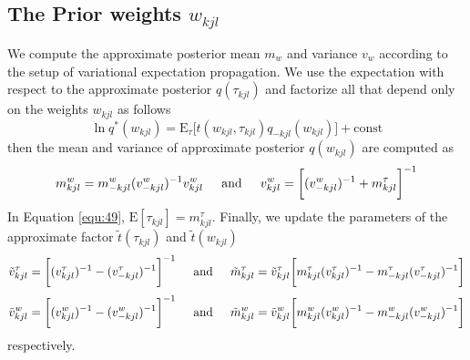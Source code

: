 \documentclass[]{article}
\begin{document}
\subsection{The Prior weights $w_{kjl}$}
We compute the approximate posterior mean $m_w$ and variance $v_w$ according to the setup of variational expectation propagation. We use the expectation with respect to the approximate posterior $q(\tau_{kjl})$ and factorize all that depend only on the weights $w_{kjl}$ as follows
\begin{equation}
	\ln q^*(w_{kjl}) = \mathrm{E}_{\tau}\bigg[t(w_{kjl},\tau_{kjl})q_{-kjl}(w_{kjl})\bigg] + \text{const}
	\label{equ:48}
\end{equation}
then the mean and variance of approximate posterior $q(w_{kjl})$ are computed as 
\begin{equation}
	m^w_{kjl} = m^w_{-kjl} (v^w_{-kjl})^{-1} v^w_{kjl}\hspace*{0.2in} \text{and} \hspace{0.2in} v^w_{kjl} = \bigg[(v^w_{-kjl})^{-1} + m^\tau_{kjl}\bigg]^{-1}
	\label{equ:49}
\end{equation}
In Equation \ref{equ:49}, $\mathrm{E}[\tau_{kjl}] = m^{\tau}_{kjl}$.
Finally, we update the parameters of the approximate factor $\tilde{t}(\tau_{kjl})$ and $\tilde{t}(w_{kjl})$
\begin{equation}
	\tilde{v}^\tau_{kjl} = \bigg[(v_{kjl}^\tau)^{-1} - (v_{-kjl}^\tau)^{-1}\bigg]^{-1} \hspace*{0.2in} \text{and} \hspace{0.2in} \tilde{m}^\tau_{kjl} = \tilde{v}^\tau_{kjl}\bigg[m_{kjl}^{\tau}(v^{\tau}_{kjl})^{-1} - m_{-kjl}^{\tau}(v^\tau_{-kjl})^{-1}\bigg]
\end{equation}
\begin{equation}
	\tilde{v}^w_{kjl} = \bigg[(v_{kjl}^w)^{-1} - (v_{-kjl}^w)^{-1}\bigg]^{-1} \hspace*{0.2in} \text{and} \hspace{0.2in} \tilde{m}^w_{kjl} = \tilde{v}^w_{kjl}\bigg[m_{kjl}^{w}(v^{w}_{kjl})^{-1} - m_{-kjl}^{w}(v^w_{-kjl})^{-1}\bigg]
\end{equation}
respectively.
\end{document}
